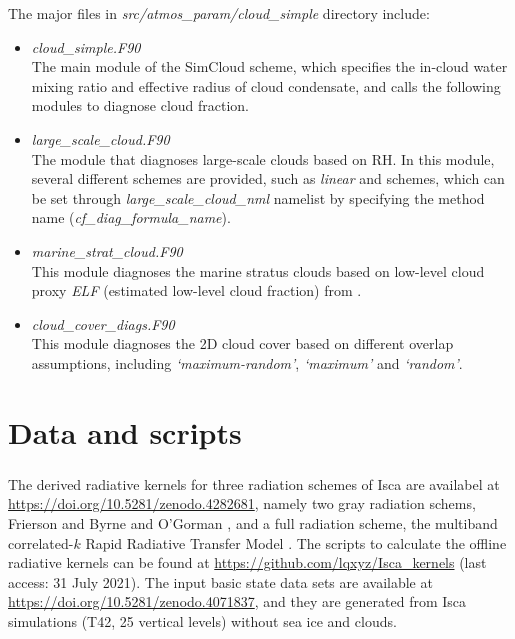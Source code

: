 The major files in \textit{src/atmos\_param/cloud\_simple} directory include:
\begin{itemize}
    \item \textit{cloud\_simple.F90} \\
    The main module of the SimCloud scheme, which specifies the in-cloud water mixing ratio and effective radius of cloud condensate, and calls the following modules to diagnose cloud fraction.
    
    \item \textit{large\_scale\_cloud.F90}\\
    The module that diagnoses large-scale clouds based on RH. In this module, several different schemes are provided, such as \textit{linear} and \textit{\cite{Sundqvist1989}} schemes, which can be set through \textit{large\_scale\_cloud\_nml} namelist by specifying the method name (\textit{cf\_diag\_formula\_name}).
    
    \item \textit{marine\_strat\_cloud.F90}\\
    This module diagnoses the marine stratus clouds based on low-level cloud proxy \textit{ELF} (estimated low-level cloud fraction) from \cite{Park2019}.

    \item \textit{cloud\_cover\_diags.F90}\\
    This module diagnoses the 2D cloud cover based on different overlap assumptions, including \textit{`maximum-random'}, \textit{`maximum'} and \textit{`random'}.
\end{itemize}

\section{Data and scripts}

\subsubsection{}

The derived radiative kernels for three radiation schemes of Isca \citep{Vallis2018} are availabel at \url{https://doi.org/10.5281/zenodo.4282681}, namely two gray radiation schems, Frierson \citep{Frierson2006} and  Byrne and O'Gorman \citep[BOG;][]{Byrne2013}, and a full radiation scheme, the multiband correlated-$k$ Rapid Radiative Transfer Model \citep[RRTM;][]{Clough2005}. The scripts to calculate the offline radiative kernels can be found at \url{https://github.com/lqxyz/Isca_kernels} (last access: 31 July 2021). The input basic state data sets are available at \url{https://doi.org/10.5281/zenodo.4071837}, and they are generated from Isca simulations (T42, 25 vertical levels) without sea ice and clouds.

